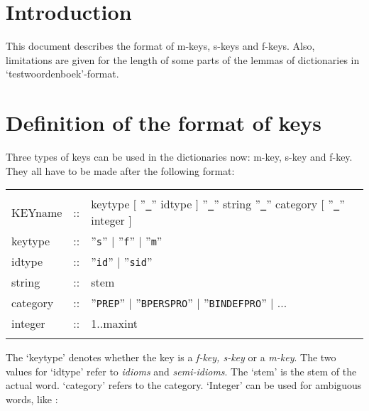 
   \RosDate{\today}
   \RosSupersedes{-}
   \MakeRosTitle

\section{Introduction}

This document describes the format of m-keys, s-keys and f-keys. Also,
limitations are given for the length of some parts of the lemmas of 
dictionaries in `testwoordenboek'-format.

\section{Definition of the format of keys}

Three types of keys can be used in the dictionaries now: m-key, s-key and f-key.
They all have to be made after the following format:

\begin{tabular}{lcl} 
        &    &   \\
KEYname & :: & keytype $[$ ''{\tt {\bf \_}}'' idtype $]$ ''{\tt {\bf \_}}'' 
               string ''{\tt {\bf \_}}'' category  $[$ ''{\tt {\bf \_}}'' 
               integer $]$   \\
keytype & :: & ''{\tt s}'' $\mid$ ''{\tt f}'' $\mid$ ''{\tt m}'' \\
idtype  & :: & ''{\tt id}'' $\mid$ ''{\tt sid}'' \\
string  & :: & stem    \\
category & :: & ''{\tt PREP}'' $\mid$ ''{\tt BPERSPRO}'' $\mid$ 
                ''{\tt BINDEFPRO}'' $\mid$  ... \\
integer & :: & 1..maxint \\  
        &    &   \\
\end{tabular}

The `keytype' denotes whether the key is a {\em f-key, s-key} or a {\em m-key}.
The two values for `idtype' refer to {\em idioms} and {\em semi-idioms}.
The `stem' is the stem of the actual word. `category' refers to the 
category.
`Integer' can be used for ambiguous words, like :

